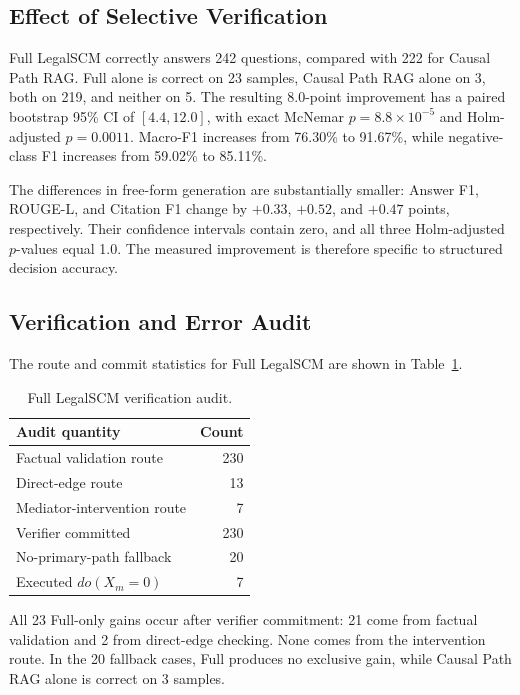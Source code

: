 \subsection{Effect of Selective Verification}

Full LegalSCM correctly answers 242 questions, compared with 222 for Causal
Path RAG. Full alone is correct on 23 samples, Causal Path RAG alone on 3,
both on 219, and neither on 5. The resulting 8.0-point improvement has a paired
bootstrap 95\% CI of $[4.4,12.0]$, with exact McNemar
$p=8.8\times10^{-5}$ and Holm-adjusted $p=0.0011$. Macro-F1 increases from
76.30\% to 91.67\%, while negative-class F1 increases from 59.02\% to 85.11\%.

The differences in free-form generation are substantially smaller: Answer F1,
ROUGE-L, and Citation F1 change by $+0.33$, $+0.52$, and $+0.47$ points,
respectively. Their confidence intervals contain zero, and all three
Holm-adjusted $p$-values equal 1.0. The measured improvement is therefore
specific to structured decision accuracy.

\subsection{Verification and Error Audit}

The route and commit statistics for Full LegalSCM are shown in
Table~\ref{tab:route_audit}.

\begin{table}[t]
\centering
\caption{Full LegalSCM verification audit.}
\label{tab:route_audit}
\small
\begin{tabular}{lr}
\toprule
\textbf{Audit quantity} & \textbf{Count}\\
\midrule
Factual validation route & 230\\
Direct-edge route & 13\\
Mediator-intervention route & 7\\
Verifier committed & 230\\
No-primary-path fallback & 20\\
Executed $do(X_m=0)$ & 7\\
\bottomrule
\end{tabular}
\end{table}

All 23 Full-only gains occur after verifier commitment: 21 come from factual
validation and 2 from direct-edge checking. None comes from the intervention
route. In the 20 fallback cases, Full produces no exclusive gain, while Causal
Path RAG alone is correct on 3 samples.

